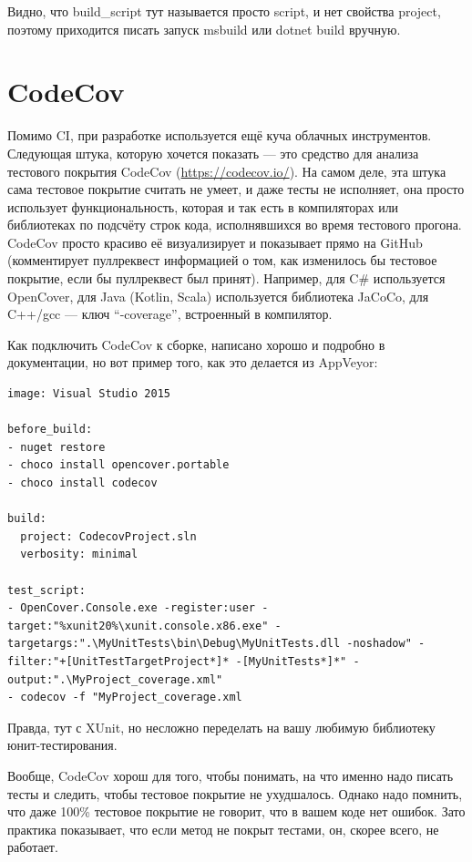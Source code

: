 \documentclass[a5paper]{article}
\begin{document}
Видно, что build\_script тут называется просто script, и нет свойства project, поэтому приходится писать запуск msbuild или dotnet build вручную.

\section{CodeCov}

Помимо CI, при разработке используется ещё куча облачных инструментов. Следующая штука, которую хочется показать --- это средство для анализа тестового покрытия CodeCov (\url{https://codecov.io/}). На самом деле, эта штука сама тестовое покрытие считать не умеет, и даже тесты не исполняет, она просто использует функциональность, которая и так есть в компиляторах или библиотеках по подсчёту строк кода, исполнявшихся во время тестового прогона. CodeCov просто красиво её визуализирует и показывает прямо на GitHub (комментирует пуллреквест информацией о том, как изменилось бы тестовое покрытие, если бы пуллреквест был принят). Например, для C\# используется OpenCover, для Java (Kotlin, Scala) используется библиотека JaCoCo, для C++/gcc --- ключ ``-coverage'', встроенный в компилятор.

Как подключить CodeCov к сборке, написано хорошо и подробно в документации, но вот пример того, как это делается из AppVeyor:

\begin{verbatim}
image: Visual Studio 2015

before_build:
- nuget restore
- choco install opencover.portable
- choco install codecov

build:
  project: CodecovProject.sln
  verbosity: minimal

test_script:
- OpenCover.Console.exe -register:user -target:"%xunit20%\xunit.console.x86.exe" -targetargs:".\MyUnitTests\bin\Debug\MyUnitTests.dll -noshadow" -filter:"+[UnitTestTargetProject*]* -[MyUnitTests*]*" -output:".\MyProject_coverage.xml"
- codecov -f "MyProject_coverage.xml
\end{verbatim}

Правда, тут с XUnit, но несложно переделать на вашу любимую библиотеку юнит-тестирования.

Вообще, CodeCov хорош для того, чтобы понимать, на что именно надо писать тесты и следить, чтобы тестовое покрытие не ухудшалось. Однако надо помнить, что даже 100\% тестовое покрытие не говорит, что в вашем коде нет ошибок. Зато практика показывает, что если метод не покрыт тестами, он, скорее всего, не работает.
\end{document}
